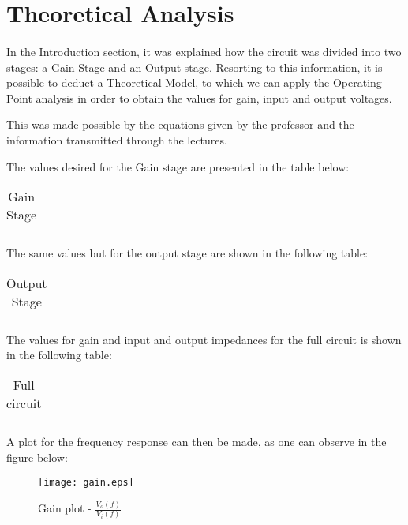 \section{Theoretical Analysis}
\label{sec:analysis}
\paragraph{}

\par In the Introduction section, it was explained how the circuit was divided into two stages: a Gain Stage and an Output stage. Resorting to this information, it is possible to deduct a Theoretical Model, to which we can apply the Operating Point analysis in order to obtain the values for gain, input and output voltages.
\par This was made possible by the equations given by the professor and the information transmitted through the lectures.
\par The values desired for the Gain stage are presented in the table below:


\begin{table}[H]
    \centering
    \begin{tabular}{|c|c|}
    \hline
        
    \end{tabular}
    \caption{Gain Stage}
    \label{table4a}
\end{table}
\par The same values but for the output stage are shown in the following table:
\begin{table}[H]
    \centering
    \begin{tabular}{|c|c|}
    \hline
        
    \end{tabular}
    \caption{Output Stage}
    \label{table4a}
\end{table}

\par The values for gain and input and output impedances for the full circuit is shown in the following table:

\begin{table}[H]
    \centering
    \begin{tabular}{|c|c|}
    \hline
        
    \end{tabular}
    \caption{Full circuit}
    \label{table4a}
\end{table}



\par A plot for the frequency response can then be made, as one can observe in the figure below:

\begin{figure}[H]
	\texttt{[image: gain.eps]}
	\centering
	\caption{Gain plot - $\frac{V_o(f)}{V_i(f)}$}
	\label{pha}
\end{figure}



